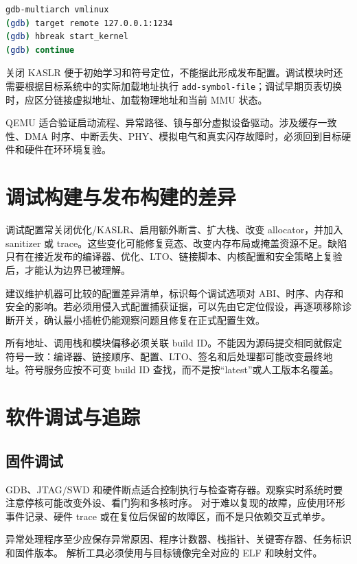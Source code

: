 \begin{lstlisting}[language=bash,caption={GDB 连接内核}]
gdb-multiarch vmlinux
(gdb) target remote 127.0.0.1:1234
(gdb) hbreak start_kernel
(gdb) continue
\end{lstlisting}

关闭 KASLR 便于初始学习和符号定位，不能据此形成发布配置。调试模块时还需要根据目标系统中的实际加载地址执行 \texttt{add-symbol-file}；调试早期页表切换时，应区分链接虚拟地址、加载物理地址和当前 MMU 状态。

QEMU 适合验证启动流程、异常路径、锁与部分虚拟设备驱动。涉及缓存一致性、DMA 时序、中断丢失、PHY、模拟电气和真实闪存故障时，必须回到目标硬件和硬件在环环境复验。

\section{调试构建与发布构建的差异}

调试配置常关闭优化/KASLR、启用额外断言、扩大栈、改变 allocator，并加入 sanitizer 或 trace。这些变化可能修复竞态、改变内存布局或掩盖资源不足。缺陷只有在接近发布的编译器、优化、LTO、链接脚本、内核配置和安全策略上复验后，才能认为边界已被理解。

建议维护机器可比较的配置差异清单，标识每个调试选项对 ABI、时序、内存和安全的影响。若必须用侵入式配置捕获证据，可以先由它定位假设，再逐项移除诊断开关，确认最小插桩仍能观察问题且修复在正式配置生效。

所有地址、调用栈和模块偏移必须关联 build ID。不能因为源码提交相同就假定符号一致：编译器、链接顺序、配置、LTO、签名和后处理都可能改变最终地址。符号服务应按不可变 build ID 查找，而不是按“latest”或人工版本名覆盖。

\section{软件调试与追踪}

\subsection{固件调试}

GDB、JTAG/SWD 和硬件断点适合控制执行与检查寄存器。观察实时系统时要注意停核可能改变外设、看门狗和多核时序。
对于难以复现的故障，应使用环形事件记录、硬件 trace 或在复位后保留的故障区，而不是只依赖交互式单步。

异常处理程序至少应保存异常原因、程序计数器、栈指针、关键寄存器、任务标识和固件版本。
解析工具必须使用与目标镜像完全对应的 ELF 和映射文件。

